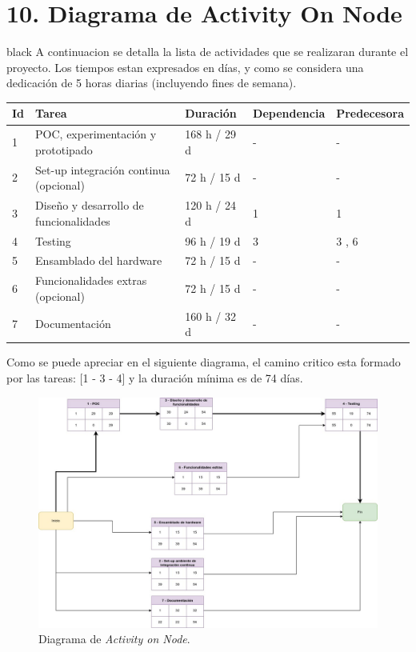 \documentclass[
11pt, %
codirector, %
]{charter}
\begin{document}
\section{10. Diagrama de Activity On Node}
\label{sec:AoN}

\begin{consigna}{black}
A continuacion se detalla la lista de actividades que se realizaran durante el proyecto. Los tiempos estan expresados en días, y como se considera una dedicación de 5 horas diarias (incluyendo fines de semana). 

\begin{table}[ht]
\begin{tabularx}{\linewidth}{@{}|l|X|l|l|l|@{}}
\hline
\rowcolor[HTML]{C0C0C0} 
Id	& Tarea           										& Duración 				 	& Dependencia	& Predecesora 	\\ \hline

1	& POC, experimentación y prototipado					& 168 h / 29 d				& -				&  -      		\\ \hline
2	& Set-up integración continua (opcional)				& 72 h / 15 d   			& -        		&  -			\\ \hline
3	& Diseño y desarrollo de funcionalidades    			& 120 h / 24 d				& 1			 	& 1				\\ \hline
4	& Testing								    			& 96 h / 19 d				& 3				& 3 , 6			\\ \hline
5	& Ensamblado del hardware				    			& 72 h / 15 d				& -				& -				\\ \hline
6	& Funcionalidades extras (opcional)						& 72 h / 15 d				& -				& - 			\\ \hline
7	& Documentación    										& 160 h / 32 d				& -			 	& -				\\ \hline

\end{tabularx}
\end{table}


Como se puede apreciar en el siguiente diagrama, el camino critico esta formado por las tareas: [1 - 3 - 4] y la duración mínima es de 74 días.


\begin{figure}[htpb]
\centering 
\includegraphics[width=.9\textwidth]{./Figuras/ProyectoFinal-Page-8.jpg}
\caption{Diagrama de \textit{Activity on Node}.}
\label{fig:diagBloques}
\end{figure}
\end{consigna}
\end{document}
